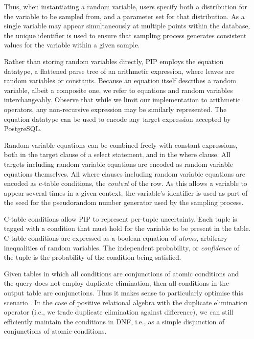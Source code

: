 Thus, when instantiating a random variable, users specify both a distribution for the variable to be sampled from, and a parameter set for that distribution.  As a single variable may appear simultaneously at multiple points within the database, the unique identifier is used to ensure that sampling process generates consistent values for the variable within a given sample.  

Rather than storing random variables directly, PIP employs the equation datatype, a flattened parse tree of an arithmetic expression, where leaves are random variables or constants.  Because an equation itself describes a random variable, albeit a composite one, we refer to equations and random variables interchangeably.  Observe that while we limit our implementation to arithmetic operators, any non-recursive expression may be similarly represented.  The equation datatype can be used to encode any target expression accepted by PostgreSQL.  

Random variable equations can be combined freely with constant expressions, both in the target clause of a select statement, and in the where clause.  All targets including random variable equations are encoded as random variable equations themselves.  All where clauses including random variable equations are encoded as c-table conditions, the \textit{context} of the row.  As this allows a variable to appear several times in a given context, the variable's identifier is used as part of the seed for the pseudorandom number generator used by the sampling process.

C-table conditions allow PIP to represent per-tuple uncertainty.  Each tuple is tagged with a condition that must hold for the variable to be present in the table.  C-table conditions are expressed as a boolean equation of \textit{atoms}, arbitrary inequalities of random variables.  The independent probability, or \textit{confidence} of the tuple is the probability of the condition being satisfied.  

Given  tables  in which  all  conditions  are  conjunctions of  atomic conditions and  the query does not employ  duplicate elimination, then all conditions  in the output  table are conjunctions.  Thus  it makes sense to particularly optimise this scenario \cite{AJKO2008}. In the case of positive relational algebra  with the duplicate elimination  operator (i.e., we trade  duplicate   elimination  against  difference),   we  can  still efficiently  maintain  the  conditions  in  DNF,  i.e.,  as  a  simple disjunction of conjunctions of atomic conditions.


